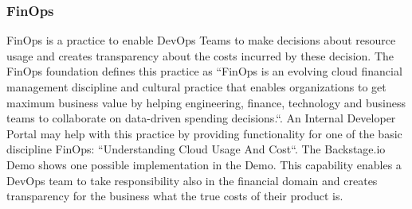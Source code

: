 \documentclass[a4paper,12pt]{article}
\begin{document}
    \subsubsection{FinOps}
    \label{sssec:finops}
    FinOps is a practice to enable DevOps Teams to make decisions about resource usage and creates transparency
    about the costs incurred by these decision.
    The FinOps foundation defines\parencite{finopsdefinition} this practice as ``FinOps is an evolving cloud financial management discipline and
    cultural practice that enables organizations to get maximum business value by helping engineering, finance,
    technology and business teams to collaborate on data-driven spending decisions.``.
    An Internal Developer Portal may help with this practice by providing functionality for one of the basic discipline
    FinOps: ``Understanding Cloud Usage And Cost``.
    The Backstage.io Demo shows one possible implementation in the Demo\parencite{backstagedemocost}.
    This capability enables a DevOps team to take responsibility also in the financial domain and creates transparency
    for the business what the true costs of their product is.
    \pagebreak
\end{document}
